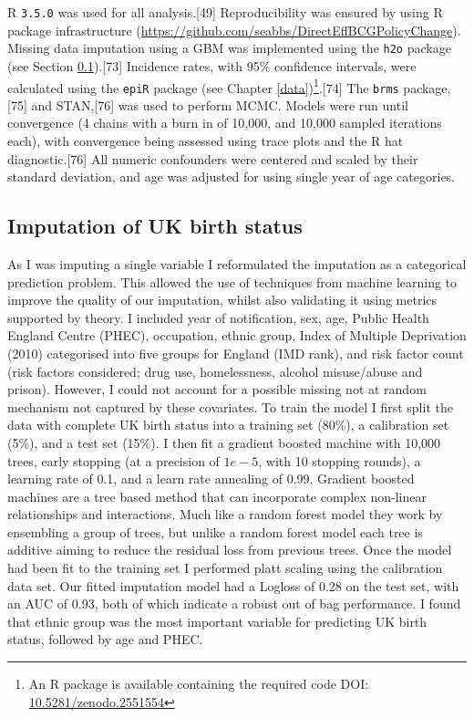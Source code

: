 \documentclass[11pt,twoside]{bristolthesis}
\begin{document}
  R \texttt{3.5.0} was used for all analysis.{[}49{]} Reproducibility was ensured by using R package infrastructure (\url{https://github.com/seabbs/DirectEffBCGPolicyChange}). Missing data imputation using a GBM was implemented using the \texttt{h2o} package (see Section \ref{imp-uk-birth-status}).{[}73{]} Incidence rates, with 95\% confidence intervals, were calculated using the \texttt{epiR} package (see Chapter \ref{data})\footnote{An R package is available containing the required code DOI: \href{https://zenodo.org/badge/latestdoi/93072437}{10.5281/zenodo.2551554}}.{[}74{]} The \texttt{brms} package,{[}75{]} and STAN,{[}76{]} was used to perform MCMC. Models were run until convergence (4 chains with a burn in of 10,000, and 10,000 sampled iterations each), with convergence being assessed using trace plots and the R hat diagnostic.{[}76{]} All numeric confounders were centered and scaled by their standard deviation, and age was adjusted for using single year of age categories.
  
  \hypertarget{imp-uk-birth-status}{%
  \subsection{Imputation of UK birth status}\label{imp-uk-birth-status}}
  
  As I was imputing a single variable I reformulated the imputation as a categorical prediction problem. This allowed the use of techniques from machine learning to improve the quality of our imputation, whilst also validating it using metrics supported by theory. I included year of notification, sex, age, Public Health England Centre (PHEC), occupation, ethnic group, Index of Multiple Deprivation (2010) categorised into five groups for England (IMD rank), and risk factor count (risk factors considered; drug use, homelessness, alcohol misuse/abuse and prison). However, I could not account for a possible missing not at random mechanism not captured by these covariates. To train the model I first split the data with complete UK birth status into a training set (80\%), a calibration set (5\%), and a test set (15\%). I then fit a gradient boosted machine with 10,000 trees, early stopping (at a precision of \(1e-5\), with 10 stopping rounds), a learning rate of 0.1, and a learn rate annealing of 0.99. Gradient boosted machines are a tree based method that can incorporate complex non-linear relationships and interactions. Much like a random forest model they work by ensembling a group of trees, but unlike a random forest model each tree is additive aiming to reduce the residual loss from previous trees. Once the model had been fit to the training set I performed platt scaling using the calibration data set. Our fitted imputation model had a Logloss of 0.28 on the test set, with an AUC of 0.93, both of which indicate a robust out of bag performance. I found that ethnic group was the most important variable for predicting UK birth status, followed by age and PHEC.
  
\end{document}

